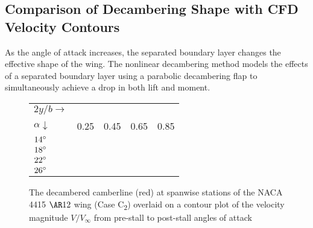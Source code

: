 \subsection{Comparison of Decambering Shape with CFD Velocity Contours}
\label{sec:dec-shape}

As the angle of attack increases, the separated boundary layer changes the effective shape of the wing.
The nonlinear decambering method models the effects of a separated boundary layer using a parabolic decambering flap to simultaneously achieve a drop in both lift and moment.
%
\begin{figure}[!ht]
    \centering
    \begin{tabular}{p{0.38in} c c c c}
        $2y/b\rightarrow$ \\ $\alpha\downarrow$ & 0.25  & 0.45 & 0.65 & 0.85 \\
        \hfil$14^\circ{}$ &  &  &  &  \\
        \hfil$18^\circ{}$ &  &  &  &  \\
        \hfil$22^\circ{}$ &  &  &  &  \\
        \hfil$26^\circ{}$ &  &  &  &  \\
    \end{tabular}
    \caption{The decambered camberline (red) at spanwise stations of the NACA 4415 $\ar{12}$ wing (Case C\textsubscript{2}) overlaid on a contour plot of the velocity magnitude $V/V_\infty$ from pre-stall to post-stall angles of attack}
    \label{fig:n4415-blpics}
\end{figure}%
%
